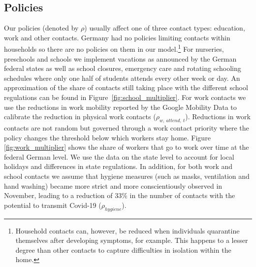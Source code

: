 \subsection{Policies}
\label{subsec:policies}

Our policies (denoted by $\rho$) usually affect one of three contact types: education,
work and other contacts.
Germany had no policies limiting contacts within households so there are no policies on
them in our model.\footnote{Household contacts can, however, be reduced when individuals
quarantine themselves after developing symptoms, for example. This happens to a lesser
degree than other contacts to capture difficulties in isolation within the home.}
For nurseries, preschools and schools we implement vacations as announced by the German
federal states as well as school closures, emergency care and rotating schooling
schedules where only one half of students attends every other week or day.
An approximation of the share of contacts still taking place with the different school
regulations can be found in Figure~\ref{fig:school_multiplier}.
For work contacts we use the reductions in work mobility reported by the Google Mobility
Data \citep{Google2021} to calibrate the reduction in physical work contacts
($\rho_{w,\:attend,\:t}$). Reductions in work contacts are not random but governed
through a work contact priority where the policy changes the threshold below which
workers stay home. Figure \ref{fig:work_multiplier} shows the share of workers that go to
work over time at the federal German level. We use the data on the state level to account
for local holidays and differences in state regulations.
In addition, for both work and school contacts we assume that hygiene measures (such as
masks, ventilation and hand washing) became more strict and more conscientiously observed
in November, leading to a reduction of 33\% in the number of contacts with the potential
to transmit Covid-19 ($\rho_{hygiene}$).


